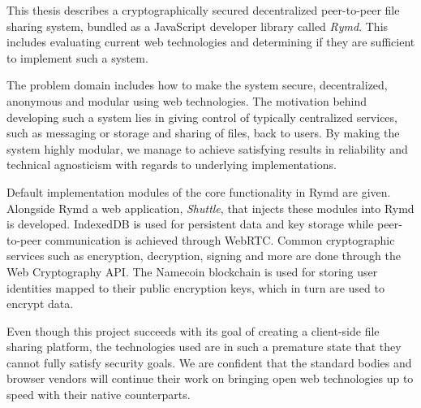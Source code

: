 %

This thesis describes a cryptographically secured decentralized peer-to-peer file sharing system, bundled as a JavaScript developer library called \emph{Rymd}. This includes evaluating current web technologies and determining if they are sufficient to implement such a system.

The problem domain includes how to make the system secure, decentralized, anonymous and modular using web technologies. The motivation behind developing such a system lies in giving control of typically centralized services, such as messaging or storage and sharing of files, back to users. By making the system highly modular, we manage to achieve satisfying results in reliability and technical agnosticism with regards to underlying implementations.

Default implementation modules of the core functionality in Rymd are given. Alongside Rymd a web application, \emph{Shuttle}, that injects these modules into Rymd is developed. IndexedDB is used for persistent data and key storage while peer-to-peer communication is achieved through WebRTC. Common cryptographic services such as encryption, decryption, signing and more are done through the Web Cryptography API. The Namecoin blockchain is used for storing user identities mapped to their public encryption keys, which in turn are used to encrypt data.

Even though this project succeeds with its goal of creating a client-side file sharing platform, the technologies used are in such a premature state that they cannot fully satisfy security goals. We are confident that the standard bodies and browser vendors will continue their work on bringing open web technologies up to speed with their native counterparts.
